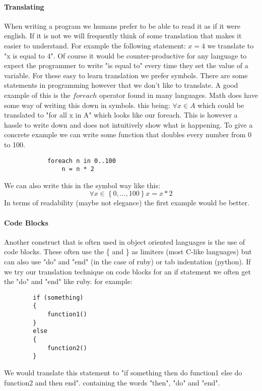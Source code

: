 \documentclass{scrartcl}
\begin{document}
    \paragraph{Translating}
    When writing a program we humans prefer to be able to read it as if it were
    english. If it is not we will frequently think of some translation that makes
    it easier to understand. For example the following statement: $x = 4$ we
    translate to "x is equal to 4". Of course it would be counter-productive for
    any language to expect the programmer to write "is equal to" every time they
    set the value of a variable. For these easy to learn translation we prefer
    symbols. There are some statements in programming however that we don't like
    to translate. A good example of this is the $foreach$ operator found in many
    languages. Math does have some way of writing this down in symbols. this being:
    $\forall x \in A$ which could be translated to "for all x in A" which looks
    like our foreach. This is however a hassle to write down and does not intuitively
    show what is happening. To give a concrete example we can write some function
    that doubles every number from 0 to 100.
        \begin{lstlisting}
            foreach n in 0..100
                n = n * 2
        \end{lstlisting}
    We can also write this in the symbol way like this:
    \begin{equation*}
        \forall x \in \left\{ 0,...,100 \right\} x = x * 2
    \end{equation*}
    In terms of readability (maybe not elegance) the first example would be better.

    \paragraph{Code Blocks}
    Another construct that is often used in object oriented languages is the use
    of code blocks. These often use the \{ and \} as limiters (most C-like languages)
    but can also use "do" and "end" (in the case of ruby) or tab indentation (python).
    If we try our translation technique on code blocks for an if statement we often
    get the "do" and "end" like ruby. for example:
    \begin{lstlisting}
        if (something)
        {    
            function1()  
        }
        else
        {
            function2()
        }
    \end{lstlisting}
    We would translate this statement to "if something then do function1 else
    do function2 and then end". containing the words "then", "do" and "end". 
\end{document}
